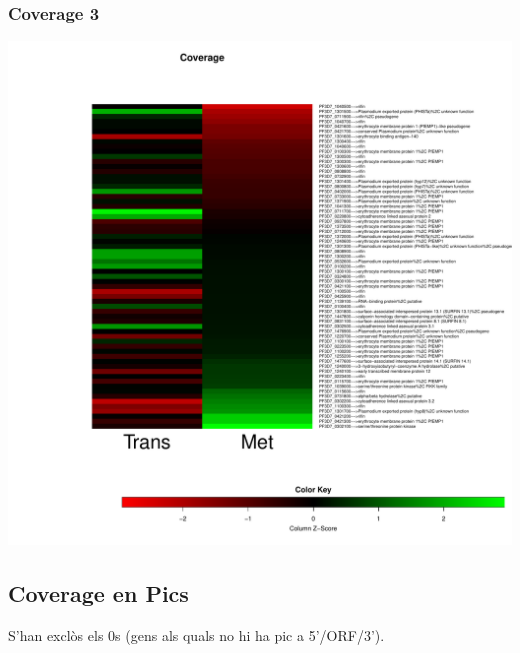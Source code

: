 \documentclass{article}\usepackage[]{graphicx}\usepackage[]{color}
\newenvironment{knitrout}{}{} %
\begin{document}
\subsubsection{Coverage 3}
\begin{knitrout}
\color{fgcolor}

{\centering \includegraphics[width=.9\linewidth]{figure/minimal-met_cov_3-1} 

}



\end{knitrout}
\clearpage

\subsection{Coverage en Pics}
S'han exclòs els 0s (gens als quals no hi ha pic a 5'/ORF/3').
\end{document}
